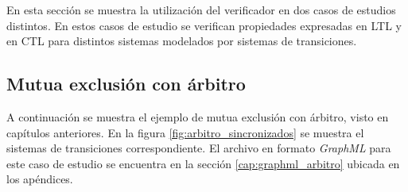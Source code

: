 En esta sección se muestra la utilización del verificador en dos casos de estudios distintos.
En estos casos de estudio se verifican propiedades expresadas en LTL y en CTL para distintos
sistemas modelados por sistemas de transiciones.

%
%
%
%
%
%

\subsection{Mutua exclusión con árbitro}
A continuación se muestra el ejemplo de mutua exclusión con árbitro, visto en
 capítulos anteriores.
En la figura \ref{fig:arbitro_sincronizados} se muestra el sistemas de transiciones
 correspondiente.
El archivo en formato \textit{GraphML} para este caso de estudio se encuentra en la
 sección \ref{cap:graphml_arbitro} ubicada en los apéndices.


